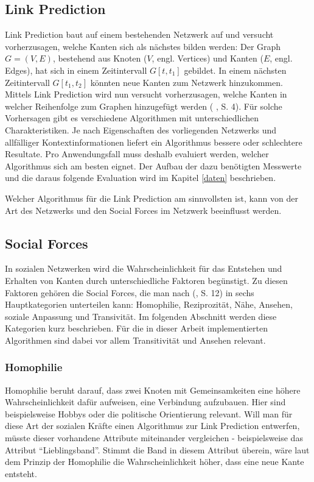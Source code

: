 \subsection{Link Prediction}
Link Prediction baut auf einem bestehenden Netzwerk auf und versucht vorherzusagen, welche Kanten sich als nächstes bilden werden:
Der Graph $G = (V, E)$, bestehend aus Knoten ($V$, engl. Vertices) und Kanten ($E$, engl. Edges), hat sich in einem Zeitintervall $G[t, t_1]$ gebildet.
In einem nächsten Zeitintervall $G[t_1, t_2]$ könnten neue Kanten zum Netzwerk hinzukommen.
Mittels Link Prediction wird nun versucht vorherzusagen, welche Kanten in welcher Reihenfolge zum Graphen hinzugefügt werden (\citeauthor{gao_link_2015} \citeyear{gao_link_2015}, S. 4).
Für solche Vorhersagen gibt es verschiedene Algorithmen mit unterschiedlichen Charakteristiken.
Je nach Eigenschaften des vorliegenden Netzwerks und allfälliger Kontextinformationen liefert ein Algorithmus bessere oder schlechtere Resultate.
Pro Anwendungsfall muss deshalb evaluiert werden, welcher Algorithmus sich am besten eignet.
Der Aufbau der dazu benötigten Messwerte und die daraus folgende Evaluation wird im Kapitel \ref{daten} beschrieben.

Welcher Algorithmus für die Link Prediction am sinnvollsten ist, kann von der Art des Netzwerks und den Social Forces im Netzwerk beeinflusst werden.

\subsection{Social Forces}
\label{socialforces}
In sozialen Netzwerken wird die Wahrscheinlichkeit für das Entstehen und Erhalten von Kanten durch unterschiedliche
Faktoren begünstigt. Zu diesen Faktoren gehören die Social Forces, die man nach \citeauthor{michael_henninger_soziale_2018} (\citeyear{michael_henninger_soziale_2018}, S. 12) in sechs Hauptkategorien unterteilen kann: Homophilie,
Reziprozität, Nähe, Ansehen, soziale Anpassung und Transivität. Im folgenden Abschnitt werden diese Kategorien kurz
beschrieben. Für die in dieser Arbeit implementierten Algorithmen sind dabei vor allem Transitivität und Ansehen
relevant.

\subsubsection{Homophilie}
Homophilie beruht darauf, dass zwei Knoten mit Gemeinsamkeiten eine höhere Wahrscheinlichkeit dafür
aufweisen, eine Verbindung aufzubauen. Hier sind beispielsweise Hobbys oder die politische Orientierung relevant. Will
man für diese Art der sozialen Kräfte einen Algorithmus zur Link Prediction entwerfen, müsste dieser vorhandene
Attribute miteinander vergleichen - beispielsweise das Attribut ``Lieblingsband''. Stimmt die Band in diesem Attribut
überein, wäre laut dem Prinzip der Homophilie die Wahrscheinlichkeit höher, dass eine neue Kante entsteht.

